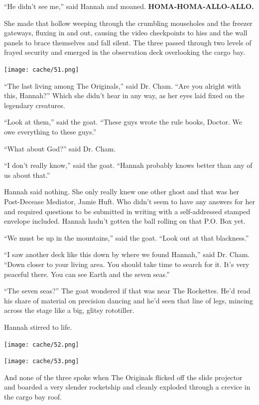 \documentclass[12pt,twoside]{report}
\begin{document}
``He didn't see me,'' said Hannah and moaned.  {\bf
  HOMA-HOMA-ALLO-ALLO.}

She made that hollow weeping through the crumbling mouseholes and the
freezer gateways, fluxing in and out, causing the video checkpoints to
hiss and the wall panels to brace themselves and fall silent.  The
three passed through two levels of frayed security and emerged in the
observation deck overlooking the cargo bay.

	\texttt{[image: cache/51.png]}

``The last living among The Originals,'' said Dr. Cham.  ``Are you
        alright with this, Hannah?''  Which she didn't hear in any
        way, as her eyes laid fixed on the legendary creatures.

``Look at them,'' said the goat.  ``These guys wrote the rule books,
        Doctor.  We owe everything to these guys.''

``What about God?'' said Dr. Cham.

``I don't really know,'' said the goat.  ``Hannah probably knows
        better than any of us about that.''

Hannah said nothing.  She only really knew one other ghost and that
was her Post-Decease Mediator, Jamie Huft.  Who didn't seem to have
any answers for her and required questions to be submitted in writing
with a self-addressed stamped envelope included.  Hannah hadn't gotten
the ball rolling on that P.O. Box yet.

``We must be up in the mountains,'' said the goat.  ``Look out at that
blackness.''

``I saw another deck like this down by where we found Hannah,'' said
Dr. Cham.  ``Down closer to your living area.  You should take time to
search for it.  It's very peaceful there. You can see Earth and the
seven seas.''

``The seven seas?''  The goat wondered if that was near The Rockettes.
He'd read his share of material on precision dancing and he'd seen
that line of legs, mincing across the stage like a big, glitsy
rototiller.

Hannah stirred to life.

	\texttt{[image: cache/52.png]}

	\texttt{[image: cache/53.png]}

And none of the three spoke when The Originals flicked off the slide
projector and boarded a very slender rocketship and cleanly exploded
through a crevice in the cargo bay roof.
\end{document}
